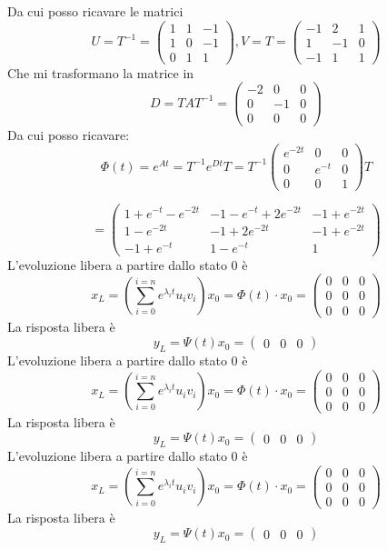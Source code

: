 \documentclass{article}
\begin{document}
Da cui posso ricavare le matrici \[U=T^{-1} = \left(\begin{matrix}1 & 1 & -1\\1 & 0 & -1\\0 & 1 & 1\end{matrix}\right), V = T = \left(\begin{matrix}-1 & 2 & 1\\1 & -1 & 0\\-1 & 1 & 1\end{matrix}\right)\]
Che mi trasformano la matrice in \[ D = TAT^{-1} = \left(\begin{matrix}-2 & 0 & 0\\0 & -1 & 0\\0 & 0 & 0\end{matrix}\right) \]
Da cui posso ricavare: \[ \Phi(t) = e^{At} = T^{-1} e^{Dt} T =  T^{-1} \left(\begin{matrix}e^{- 2 t} & 0 & 0\\0 & e^{- t} & 0\\0 & 0 & 1\end{matrix}\right) T\]

\[ = \left(\begin{matrix}1 + e^{- t} - e^{- 2 t} & -1 - e^{- t} + 2 e^{- 2 t} & -1 + e^{- 2 t}\\1 - e^{- 2 t} & -1 + 2 e^{- 2 t} & -1 + e^{- 2 t}\\-1 + e^{- t} & 1 - e^{- t} & 1\end{matrix}\right) \]L'evoluzione libera  a partire dallo stato $ 0 $ è \[ x_L = (\sum_{i=0}^{i=n} e^{\lambda_i t}u_i v_i)x_0=\Phi(t) \cdot x_0 = \left(\begin{matrix}0 & 0 & 0\\0 & 0 & 0\\0 & 0 & 0\end{matrix}\right) \]
La risposta libera è \[ y_L = \Psi(t) x_0 = \left(\begin{matrix}0 & 0 & 0\end{matrix}\right) \]
L'evoluzione libera  a partire dallo stato $ 0 $ è \[ x_L = (\sum_{i=0}^{i=n} e^{\lambda_i t}u_i v_i)x_0=\Phi(t) \cdot x_0 = \left(\begin{matrix}0 & 0 & 0\\0 & 0 & 0\\0 & 0 & 0\end{matrix}\right) \]
La risposta libera è \[ y_L = \Psi(t) x_0 = \left(\begin{matrix}0 & 0 & 0\end{matrix}\right) \]
L'evoluzione libera  a partire dallo stato $ 0 $ è \[ x_L = (\sum_{i=0}^{i=n} e^{\lambda_i t}u_i v_i)x_0=\Phi(t) \cdot x_0 = \left(\begin{matrix}0 & 0 & 0\\0 & 0 & 0\\0 & 0 & 0\end{matrix}\right) \]
La risposta libera è \[ y_L = \Psi(t) x_0 = \left(\begin{matrix}0 & 0 & 0\end{matrix}\right) \]
\end{document}
